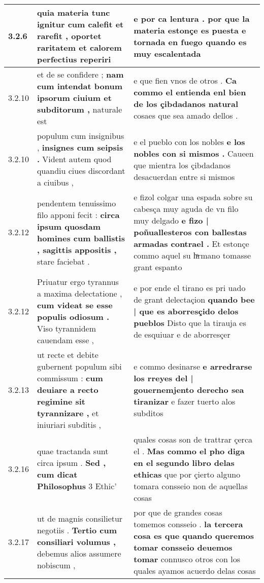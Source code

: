 \begin{tabular}{|p{1cm}|p{6.5cm}|p{6.5cm}|}
3.2.6 & quia materia tunc ignitur \textbf{ cum calefit et rarefit , } oportet raritatem et calorem perfectius reperiri & e por ca lentura . \textbf{ por que la materia estonçe es puesta e tornada en fuego } quando es muy escalentada \\\hline
3.2.10 & et de se confidere ; \textbf{ nam cum intendat bonum ipsorum ciuium et subditorum , } naturale est & e que fien vnos de otros . \textbf{ Ca commo el entienda enl bien de los çibdadanos natural } cosaes que sea amado dellos . \\\hline
3.2.10 & populum cum insignibus , \textbf{ insignes cum seipsis . } Vident autem quod quandiu ciues discordant a ciuibus , & e el pueblo con los nobles \textbf{ e los nobles con si mismos . } Caueen que mientra los çibdadanos desacuerdan entre si mismos \\\hline
3.2.12 & pendentem tenuissimo filo apponi fecit : \textbf{ circa ipsum quosdam homines cum ballistis , sagittis appositis , } stare faciebat . & e fizol colgar una espada sobre su cabesça muy aguda de vn filo muy delgado \textbf{ e fizo | poñuallesteros con ballestas armadas contrael . } Et estonçe commo aquel su hͣrmano tomasse grant espanto \\\hline
3.2.12 & Priuatur ergo tyrannus a maxima delectatione , \textbf{ cum videat se esse populis odiosum . } Viso tyrannidem cauendam esse , & e por ende el tirano es pri uado de grant delectaçion \textbf{ quando bee | que es aborresçido delos pueblos } Disto que la tirauja es de esquiuar e de aborresçer \\\hline
3.2.13 & ut recte et debite gubernent populum sibi commissum : \textbf{ cum deuiare a recto regimine sit tyrannizare , } et iniuriari subditis , & e commo desinarse \textbf{ e arredrarse los rreyes del | gouernemjento derecho sea tiranizar } e fazer tuerto alos subditos \\\hline
3.2.16 & quae tractanda sunt circa ipsum . \textbf{ Sed , cum dicat Philosophus } 3 Ethic’ & quales cosas son de trattrar çerca el . \textbf{ Mas commo el pho diga en el segundo libro delas ethicas } que por çierto alguno tomara consseio non de aquellas cosas \\\hline
3.2.17 & ut de magnis consilietur negotiis . \textbf{ Tertio cum consiliari volumus , } debemus alios assumere nobiscum , & por que de grandes cosas tomemos consseio . \textbf{ la tercera cosa es que quando queremos tomar consseio deuemos tomar } connusco otros con los quales ayamos acuerdo delas cosas \\\hline

\end{tabular}
